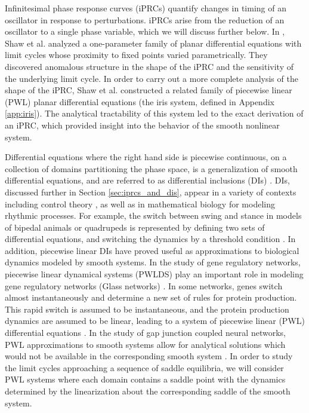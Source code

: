 \documentclass[12pt]{article}
\begin{document}
   Infinitesimal phase response curves (iPRCs) quantify changes in timing of an oscillator in response to perturbations. iPRCs arise from the reduction of an oscillator to a single phase variable, which we will discuss further below.  In \cite{ShawParkChielThomas2012SIADS}, Shaw et al. analyzed a one-parameter family of planar differential equations with limit cycles whose proximity to fixed points varied parametrically.  They discovered anomalous structure in the shape of the iPRC and the sensitivity of the underlying limit cycle.  In order to carry out a more complete analysis of the shape of the iPRC, Shaw et al. constructed a related family of piecewise linear (PWL) planar differential equations (the iris system, defined in Appendix \ref{app:iris}).  The analytical tractability of this system led to the exact derivation of an iPRC, which provided insight into the 
behavior of the smooth nonlinear system.
   
   Differential equations where the right hand side is piecewise continuous, on a collection of domains partitioning the phase space, is a generalization of smooth differential equations, and are referred to as differential inclusions (DIs) \cite{Filipov1988}.  DIs, discussed further in Section \ref{sec:iprcs_and_dis}, appear in a variety of contexts including control theory \cite{PadenSastry:1987}, as well as in mathematical biology for modeling rhythmic processes.  For example, the switch between swing and stance in models of bipedal animals or quadrupeds is represented by defining two sets of differential equations, and switching the dynamics by a threshold condition \cite{SpardyEtAlRubin2011a,SpardyEtAlRubin2011b}.  In addition, piecewise linear DIs have proved useful as approximations to biological dynamics modeled by smooth systems.  In the study of gene regulatory networks, piecewise linear dynamical systems (PWLDS) play an important role in modeling gene regulatory networks (Glass networks) \cite{
Glass1973103}. In some networks, genes switch almost instantaneously and 
determine a new set of rules for protein production.  This rapid switch is assumed to be instantaneous, and the protein production dynamics are assumed to be linear, leading to a system of piecewise linear (PWL) differential equations \cite{Gebert20071148}.  In the study of gap junction coupled neural networks, PWL approximations to smooth systems allow for analytical solutions which would not be available in the corresponding smooth system \cite{Coombes:2008:SIADS}.  In order to study the limit cycles approaching a sequence of saddle equilibria, we will consider PWL systems where each domain contains a saddle point with the dynamics determined by the linearization about the corresponding saddle of the smooth system.
\end{document}
